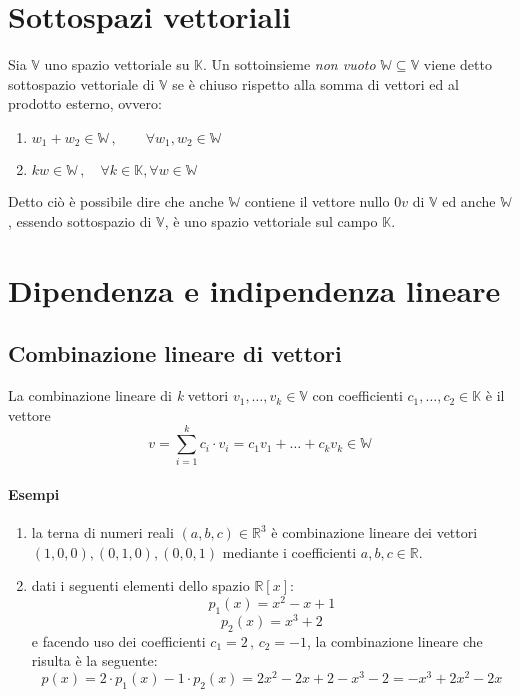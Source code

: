 	\section{Sottospazi vettoriali}
		Sia $\mathbb{V}$ uno spazio vettoriale su $\mathbb{K}$.
		Un sottoinsieme \emph{non vuoto} $ \mathbb{W} \subseteq \mathbb{V} $ viene detto sottospazio vettoriale di $\mathbb{V}$ se è chiuso rispetto alla somma di vettori ed al prodotto esterno, ovvero:
		\begin{enumerate}[(1)]
			\item $ w_1 + w_2 \in \mathbb{W} \, , \qquad \forall w_1, w_2 \in \mathbb{W} $
			\item $ kw \in \mathbb{W} \, , \quad \forall k \in \mathbb{K}, \forall w \in \mathbb{W} $
		\end{enumerate}
		Detto ciò è possibile dire che anche $\mathbb{W}$ contiene il vettore nullo $0v$ di $\mathbb{V}$ ed anche $\mathbb{W}$, essendo sottospazio di $\mathbb{V}$, è uno spazio vettoriale sul campo $\mathbb{K}$.

	\section{Dipendenza e indipendenza lineare}
		\subsection{Combinazione lineare di vettori}
			La combinazione lineare di \textit{k} vettori $v_1, \dots, v_k \in \mathbb{V} $ con coefficienti $ c_1, \dots, c_2 \in \mathbb{K} $ è il vettore $$ v = \sum_{i=1}^{k} c_i \cdot v_i = c_1v_1 + \dots + c_kv_k \in \mathbb{W} $$
			
			\begin{GrayBox}
				\paragraph{Esempi}
				\begin{enumerate}
					\item la terna di numeri reali $(a, b, c) \in \mathbb{R}^3 $ è combinazione lineare dei vettori $(1, 0, 0), (0, 1, 0), (0, 0, 1)$ mediante i coefficienti $a, b, c \in \mathbb{R}$.
					\item dati i seguenti elementi dello spazio $\mathbb{R}[x]$:
					$$ p_1(x) = x^2 - x + 1 $$
					$$ p_2(x) = x^3 + 2 $$
					e facendo uso dei coefficienti $c_1 = 2 \, , \, c_2 = -1 $, la combinazione lineare che risulta è la seguente:
					$$ p(x) = 2 \cdot p_1(x) - 1 \cdot p_2(x) = 2x^2 - 2x + 2 - x^3 - 2 = -x^3 + 2x^2 - 2x $$ 
				\end{enumerate}
			\end{GrayBox}
			
